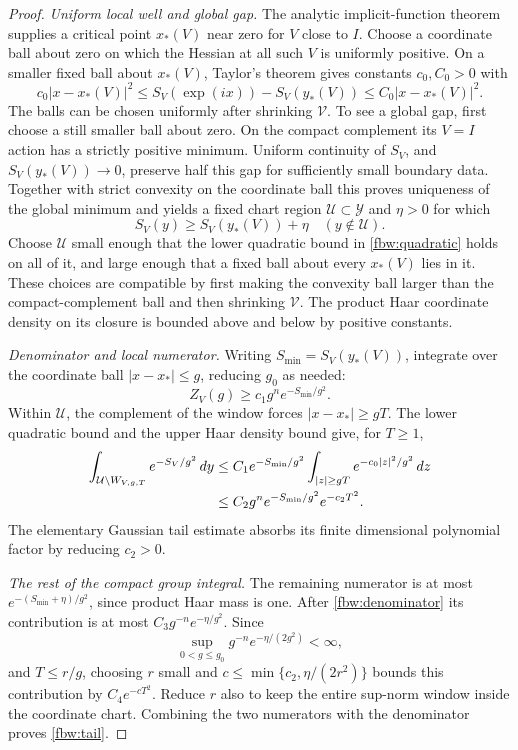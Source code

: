 \documentclass[11pt]{article}
\theoremstyle{remark}
\begin{document}
\begin{proof}
\emph{Uniform local well and global gap.}
The analytic implicit-function theorem supplies a critical point
\(x_*(V)\) near zero for \(V\) close to \(I\). Choose a coordinate
ball about zero on which the Hessian at all such \(V\) is uniformly
positive. On a smaller fixed ball about \(x_*(V)\), Taylor's theorem
gives constants \(c_0,C_0>0\) with
\begin{equation}
 c_0|x-x_*(V)|^2\leq S_V(\exp(ix))-S_V(y_*(V))
       \leq C_0|x-x_*(V)|^2.
 \label{fbw:quadratic}
\end{equation}
The balls can be chosen uniformly after shrinking \(\mathcal V\).
To see a global gap, first choose a still smaller ball about zero.
On the compact complement its \(V=I\) action has a strictly positive
minimum. Uniform continuity of \(S_V\), and \(S_V(y_*(V))\to0\),
preserve half this gap for sufficiently small boundary data.
Together with strict convexity on the coordinate ball this proves
uniqueness of the global minimum and yields a fixed chart region
\(\mathcal U\subset\mathcal Y\) and \(\eta>0\) for which
\begin{equation}
 S_V(y)\geq S_V(y_*(V))+\eta\quad(y\notin\mathcal U).
 \label{fbw:gap}
\end{equation}
Choose \(\mathcal U\) small enough that the lower quadratic bound in
\eqref{fbw:quadratic} holds on all of it, and large enough that a
fixed ball about every \(x_*(V)\) lies in it. These choices are
compatible by first making the convexity ball larger than the
compact-complement ball and then shrinking \(\mathcal V\).
The product Haar coordinate density on its closure is bounded above
and below by positive constants.

\emph{Denominator and local numerator.}
Writing \(S_{\min}=S_V(y_*(V))\), integrate over the coordinate
ball \(|x-x_*|\leq g\), reducing \(g_0\) as needed:
\begin{equation}
 Z_V(g)\geq c_1 g^n e^{-S_{\min}/g^2}.
 \label{fbw:denominator}
\end{equation}
Within \(\mathcal U\), the complement of the window forces
\(|x-x_*|\geq gT\). The lower quadratic bound and the upper Haar
density bound give, for \(T\geq1\),
\begin{align}
 \int_{\mathcal U\setminus W_{V,g,T}}e^{-S_V/g^2}\,dy
 &\leq C_1 e^{-S_{\min}/g^2}
       \int_{|z|\geq gT}e^{-c_0|z|^2/g^2}\,dz \notag\\
 &\leq C_2 g^n e^{-S_{\min}/g^2}e^{-c_2T^2}.
 \label{fbw:localnumerator}
\end{align}
The elementary Gaussian tail estimate absorbs its finite dimensional
polynomial factor by reducing \(c_2>0\).

\emph{The rest of the compact group integral.}
The remaining numerator is at most
\(e^{-(S_{\min}+\eta)/g^2}\), since product Haar mass is one.
After \eqref{fbw:denominator} its contribution is at most
\(C_3g^{-n}e^{-\eta/g^2}\). Since
\[
 \sup_{0<g\leq g_0}g^{-n}e^{-\eta/(2g^2)}<\infty,
\]
and \(T\leq r/g\), choosing \(r\) small and
\(c\leq \min\{c_2,\eta/(2r^2)\}\) bounds this contribution by
\(C_4e^{-cT^2}\). Reduce \(r\) also to keep the entire sup-norm
window inside the coordinate chart. Combining the two numerators
with the denominator proves \eqref{fbw:tail}.
\end{proof}
\end{document}
